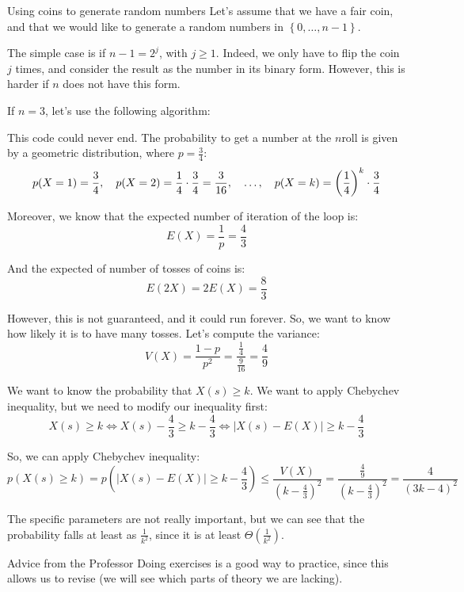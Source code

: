 \documentclass[a4paper]{article}
\begin{document}
\begin{parag}{Using coins to generate random numbers}
    Let's assume that we have a fair coin, and that we would like to generate a random numbers in $\left\{0, \ldots, n-1\right\}$.

    The simple case is if $n - 1 = 2^j$, with $j \geq 1$. Indeed, we only have to flip the coin $j$ times, and consider the result as the number in its binary form. However, this is harder if $n$ does not have this form.

    If $n = 3$, let's use the following algorithm:
    
    This code could never end. The probability to get a number at the $n$\Th roll is given by a geometric distribution, where $p = \frac{3}{4}$: 
    \[p\left(X = 1\right) = \frac{3}{4}, \mathspace p\left(X = 2\right) = \frac{1}{4}\cdot \frac{3}{4} = \frac{3}{16}, \mathspace \ldots, \mathspace p\left(X = k\right) = \left(\frac{1}{4}\right)^k \cdot \frac{3}{4}\]
    
    Moreover, we know that the expected number of iteration of the loop is: 
    \[E\left(X\right) = \frac{1}{p} = \frac{4}{3}\]

    And the expected of number of tosses of coins is: 
    \[E\left(2X\right) = 2E\left(X\right) = \frac{8}{3}\]
    
    However, this is not guaranteed, and it could run forever. So, we want to know how likely it is to have many tosses. Let's compute the variance: 
    \[V\left(X\right) = \frac{1 - p}{p^2} = \frac{\frac{1}{4}}{\frac{9}{16}} = \frac{4}{9}\]
    
    We want to know the probability that $X\left(s\right) \geq k$. We want to apply Chebychev inequality, but we need to modify our inequality first: 
    \[X\left(s\right) \geq k \iff X\left(s\right) - \frac{4}{3} \geq k - \frac{4}{3} \iff \left|X\left(s\right) - E\left(X\right)\right| \geq k - \frac{4}{3}\]
    
    So, we can apply Chebychev inequality: 
    \[p\left(X\left(s\right) \geq k\right) = p\left(\left|X\left(s\right) - E\left(X\right)\right| \geq k - \frac{4}{3}\right) \leq \frac{V\left(X\right)}{\left(k - \frac{4}{3}\right)^2} = \frac{\frac{4}{9}}{\left(k - \frac{4}{3}\right)^2} = \frac{4}{\left(3k - 4\right)^2}\]

    The specific parameters are not really important, but we can see that the probability falls at least as $\frac{1}{k^2}$, since it is at least $\Theta\left(\frac{1}{k^2}\right)$.
\end{parag}

\begin{parag}{Advice from the Professor}
    Doing exercises is a good way to practice, since this allows us to revise (we will see which parts of theory we are lacking).
\end{parag}
\end{document}
